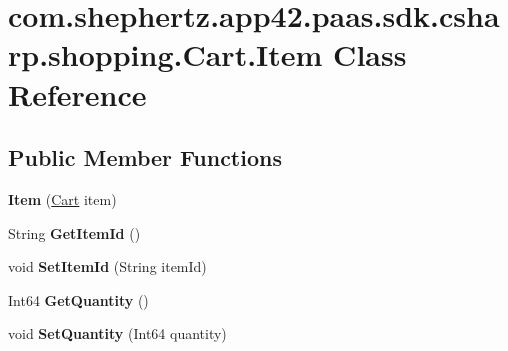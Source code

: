 \hypertarget{classcom_1_1shephertz_1_1app42_1_1paas_1_1sdk_1_1csharp_1_1shopping_1_1_cart_1_1_item}{\section{com.\+shephertz.\+app42.\+paas.\+sdk.\+csharp.\+shopping.\+Cart.\+Item Class Reference}
\label{classcom_1_1shephertz_1_1app42_1_1paas_1_1sdk_1_1csharp_1_1shopping_1_1_cart_1_1_item}
}
\subsection*{Public Member Functions}
\begin{DoxyCompactItemize}
\item 
\hypertarget{classcom_1_1shephertz_1_1app42_1_1paas_1_1sdk_1_1csharp_1_1shopping_1_1_cart_1_1_item_a50aac6306c6ce88233947cd528935517}{{\bfseries Item} (\hyperlink{classcom_1_1shephertz_1_1app42_1_1paas_1_1sdk_1_1csharp_1_1shopping_1_1_cart}{Cart} item)}\label{classcom_1_1shephertz_1_1app42_1_1paas_1_1sdk_1_1csharp_1_1shopping_1_1_cart_1_1_item_a50aac6306c6ce88233947cd528935517}

\item 
\hypertarget{classcom_1_1shephertz_1_1app42_1_1paas_1_1sdk_1_1csharp_1_1shopping_1_1_cart_1_1_item_affc9ec8bb0421b82f6ec956394160ca3}{String {\bfseries Get\+Item\+Id} ()}\label{classcom_1_1shephertz_1_1app42_1_1paas_1_1sdk_1_1csharp_1_1shopping_1_1_cart_1_1_item_affc9ec8bb0421b82f6ec956394160ca3}

\item 
\hypertarget{classcom_1_1shephertz_1_1app42_1_1paas_1_1sdk_1_1csharp_1_1shopping_1_1_cart_1_1_item_aeee8bd243981dadf2b4de9e95f7a08c8}{void {\bfseries Set\+Item\+Id} (String item\+Id)}\label{classcom_1_1shephertz_1_1app42_1_1paas_1_1sdk_1_1csharp_1_1shopping_1_1_cart_1_1_item_aeee8bd243981dadf2b4de9e95f7a08c8}

\item 
\hypertarget{classcom_1_1shephertz_1_1app42_1_1paas_1_1sdk_1_1csharp_1_1shopping_1_1_cart_1_1_item_a3542e982fe6c80090e40a703ab05f407}{Int64 {\bfseries Get\+Quantity} ()}\label{classcom_1_1shephertz_1_1app42_1_1paas_1_1sdk_1_1csharp_1_1shopping_1_1_cart_1_1_item_a3542e982fe6c80090e40a703ab05f407}

\item 
\hypertarget{classcom_1_1shephertz_1_1app42_1_1paas_1_1sdk_1_1csharp_1_1shopping_1_1_cart_1_1_item_aab3773b46317c95329239d156d330232}{void {\bfseries Set\+Quantity} (Int64 quantity)}\label{classcom_1_1shephertz_1_1app42_1_1paas_1_1sdk_1_1csharp_1_1shopping_1_1_cart_1_1_item_aab3773b46317c95329239d156d330232}


\end{DoxyCompactItemize}
